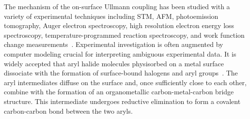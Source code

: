 \documentclass[aps,prb,reprint,amsmath,amssymb]{revtex4-1}
\newcommand{\lock}{\color{red}}
\newcommand{\lock}{\color{black}}
\newcommand{\sinfo}{Supporting Information}
\begin{document}

{\lock

The mechanism of the on-surface Ullmann coupling has been studied with a variety of experimental techniques including STM, AFM, photoemission tomography, Auger electron spectroscopy, high resolution electron energy loss spectroscopy, temperature-programmed reaction spectroscopy, and work function change measurements~\cite{ullmann_143, sur_sci01, ullmann_141, ullmann_142, ullmann_87, sur_sci02, ullmann_144}. Experimental investigation is often augmented by computer modeling crucial for interpreting ambiguous experimental data.
%
%
%
It is widely accepted that aryl halide molecules physisorbed on a metal surface dissociate with the formation of surface-bound halogens and aryl groups~\cite{ullmann_145, sur_sci01, ullmann_87, sur_sci03}. The aryl intermediates diffuse on the surface and, once sufficiently close to each other, combine with the formation of an organometallic carbon-metal-carbon bridge structure. This intermediate undergoes reductive elimination to form a covalent carbon-carbon bond between the two aryls. %

}%

\end{document}
